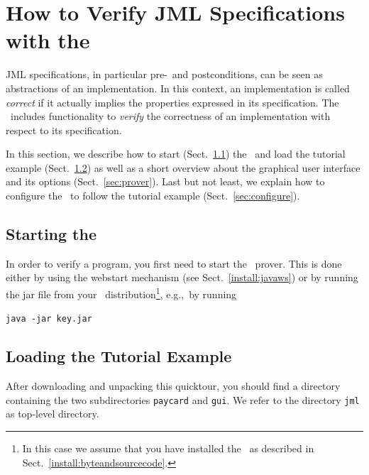 \section{How to Verify JML Specifications with the \kt}
\label{sec:analyze}

JML specifications, in particular pre-~and postconditions, can be seen
as abstractions of an implementation.  In this context, an
implementation is called {\em correct} if it actually implies the
properties expressed in its specification. The \kt\ includes
functionality to {\em verify} the correctness of an implementation
with respect to its specification. 

In this section, we describe how to start (Sect.~\ref{sec:starting})
the \kp\ and load the tutorial example (Sect.~\ref{sec:loading}) as
well as a short overview about the graphical user interface and its
options (Sect.~\ref{sec:prover}). Last but not least, we explain
how to configure the \kp\ to follow the tutorial example
(Sect.~\ref{sec:configure}).


\subsection{Starting the \kp}
\label{sec:starting}

In order to verify a program, you first need to start the \KeY\
prover. This is done either by using the webstart mechanism (see
Sect.~\ref{install:javaws}) or by running the jar file from 
your \KeY\ distribution\footnote{In
  this case we assume that you have installed the \kt\ as described in
Sect.~\ref{install:byteandsourcecode}.}, e.g.,~by
running
  \begin{center}
    \texttt{java -jar key.jar} 
  \end{center}


\subsection{Loading the Tutorial Example}
\label{sec:loading}

After downloading and unpacking this quicktour, you should find a
directory containing the two subdirectories
\texttt{paycard} and \texttt{gui}. We refer to the directory
\texttt{jml} as top-level directory.


